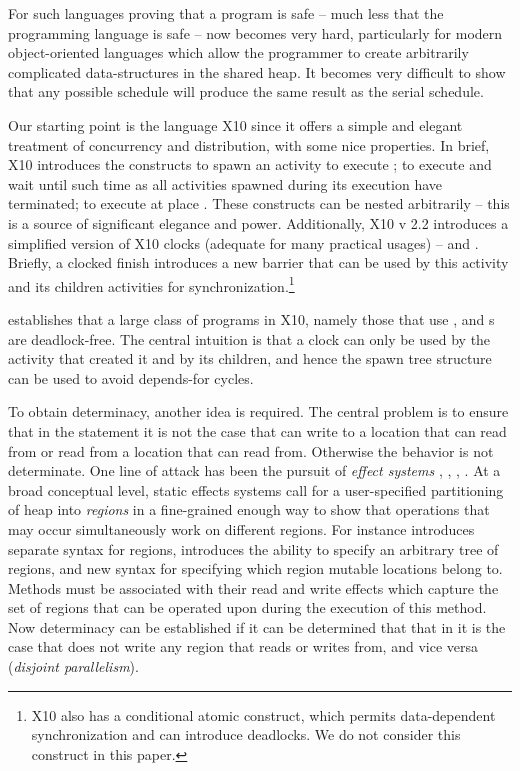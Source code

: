 For such languages proving that a program is safe -- much less that
the programming language is safe -- now becomes very hard,
particularly for modern object-oriented languages which allow the
programmer to create arbitrarily complicated data-structures in the
shared heap. It becomes very difficult to show that any possible
schedule will produce the same result as the serial schedule.

Our starting point is the language X10 \cite{x10} since it offers a
simple and elegant treatment of concurrency and distribution, with
some nice properties.  In brief, X10
introduces the constructs  to spawn an activity to
execute ;  to execute  and wait until
such time as all activities spawned during its execution have
terminated;  to execute  at place
. These constructs can be nested arbitrarily -- this is a
source of significant elegance and power. Additionally, X10 v 2.2
introduces a simplified version of X10 clocks (adequate for many
practical usages) --  and . Briefly, a clocked finish introduces a new barrier that can be
used by this activity and its children activities for
synchronization.\footnote{X10 also has a conditional atomic construct,
   which permits data-dependent synchronization and
  can introduce deadlocks. We do not consider this construct in this paper.}

\cite{vj-clock} establishes that a large class of programs
in X10, namely those that use ,  and
s are deadlock-free. The central intuition is that a clock
can only be used by the activity that created it and by its children,
and hence the spawn tree structure can be used to avoid depends-for
cycles. 

To obtain determinacy, another idea is required. The central problem
is to ensure that in the statement  it is not the
case that  can write to a location that  can read
from or read from a location that  can read from. Otherwise
the behavior is not determinate. One line of attack has been the pursuit
of {\em effect systems} \cite{Lucassen:1988:PES:73560.73564},
\cite{Leino:2002:UDG:543552.512559},
\cite{boyland:01interdependence},
\cite{DPJ}. At a broad conceptual level, static effects systems call
for a user-specified partitioning of heap into {\em regions} in a
fine-grained enough way to show that operations that may occur
simultaneously work on different regions. For instance \cite{DPJ}
introduces separate syntax for regions, introduces the ability to
specify an arbitrary tree of regions, and new syntax for specifying
which region mutable locations belong to. Methods must be associated
with their read and write effects which capture the set of regions
that can be operated upon during the execution of this
method. Now determinacy can be established if it can be determined
that that in  it is the case that  does
not write any region that  reads or writes from, and vice
versa ({\em disjoint parallelism}). 

